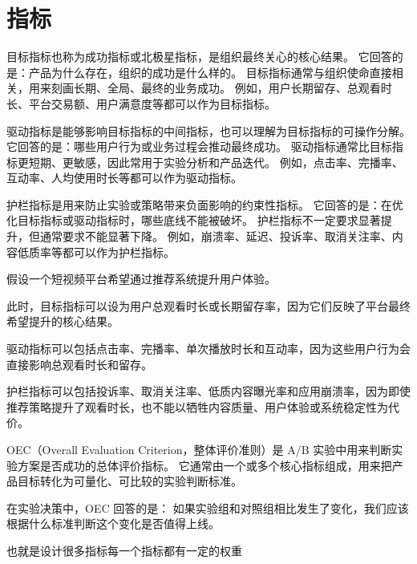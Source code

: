 \chapter{指标}
\begin{definition}[目标指标]
目标指标也称为成功指标或北极星指标，是组织最终关心的核心结果。
它回答的是：产品为什么存在，组织的成功是什么样的。
目标指标通常与组织使命直接相关，用来刻画长期、全局、最终的业务成功。
例如，用户长期留存、总观看时长、平台交易额、用户满意度等都可以作为目标指标。
\end{definition}

\begin{definition}[驱动指标]
驱动指标是能够影响目标指标的中间指标，也可以理解为目标指标的可操作分解。
它回答的是：哪些用户行为或业务过程会推动最终成功。
驱动指标通常比目标指标更短期、更敏感，因此常用于实验分析和产品迭代。
例如，点击率、完播率、互动率、人均使用时长等都可以作为驱动指标。
\end{definition}

\begin{definition}[护栏指标]
护栏指标是用来防止实验或策略带来负面影响的约束性指标。
它回答的是：在优化目标指标或驱动指标时，哪些底线不能被破坏。
护栏指标不一定要求显著提升，但通常要求不能显著下降。
例如，崩溃率、延迟、投诉率、取消关注率、内容低质率等都可以作为护栏指标。
\end{definition}
\begin{example}[短视频推荐场景]
假设一个短视频平台希望通过推荐系统提升用户体验。

此时，目标指标可以设为用户总观看时长或长期留存率，因为它们反映了平台最终希望提升的核心结果。

驱动指标可以包括点击率、完播率、单次播放时长和互动率，因为这些用户行为会直接影响总观看时长和留存。

护栏指标可以包括投诉率、取消关注率、低质内容曝光率和应用崩溃率，因为即使推荐策略提升了观看时长，也不能以牺牲内容质量、用户体验或系统稳定性为代价。
\end{example}
\begin{definition}[OEC]
OEC（Overall Evaluation Criterion，整体评价准则）是 A/B 实验中用来判断实验方案是否成功的总体评价指标。
它通常由一个或多个核心指标组成，用来把产品目标转化为可量化、可比较的实验判断标准。

在实验决策中，OEC 回答的是：
如果实验组和对照组相比发生了变化，我们应该根据什么标准判断这个变化是否值得上线。
\end{definition}
\begin{dxtips}
    也就是设计很多指标每一个指标都有一定的权重
\end{dxtips}